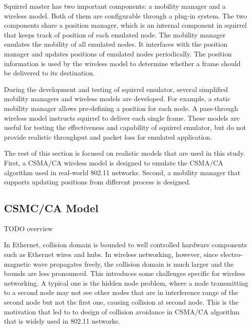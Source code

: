 \documentclass[12pt]{report}
\begin{document}
Squirrel master has two important components: a mobility manager and a wireless model. Both of them are configurable through a plug-in system. The two components share a position manager, which is an internal component in squirrel that keeps track of position of each emulated node. The mobility manager emulates the mobility of all emulated nodes. It interfaces with the position manager and updates positions of emulated nodes periodically. The position information is used by the wireless model to determine whether a frame should be delivered to its destination.

During the development and testing of squirrel emulator, several simplified mobility managers and wireless models are developed. For example, a static mobility manager allows pre-defining a position for each node. A pass-through wireless model instructs squirrel to deliver each single frame. These models are useful for testing the effectiveness and capability of squirrel emulator, but do not provide realistic throughput and packet loss for emulated application.

The rest of this section is focused on realistic models that are used in this study. First, a CSMA/CA wireless model is designed to emulate the CSMA/CA algorithm used in real-world 802.11 networks. Second, a mobility manager that supports updating positions from different process is designed.

\subsection{CSMC/CA Model}
\label{sec:squirrel_csmaca}

TODO overview

In Ethernet, collision domain is bounded to well controlled hardware components such as Ethernet wires and hubs. In wireless networking, however, since electro-magnetic wave propagates freely, the collision domain is much larger and the bounds are less pronounced. This introduces some challenges specific for wireless networking. A typical one is the hidden node problem, where a node transmitting to a second node may not see other nodes that are in interference range of the second node but not the first one, causing collision at second node. This is the motivation that led to to design of collision avoidance in CSMA/CA algorithm that is widely used in 802.11 networks.
\end{document}
